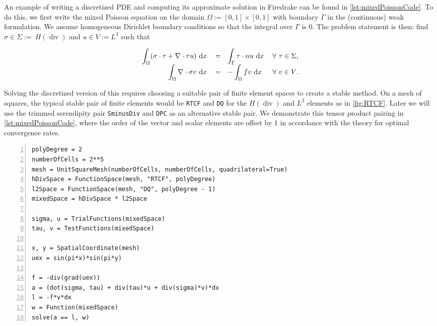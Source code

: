 \documentclass[format=acmsmall,screen,timestamp=false,a4paper]{acmart}
\DeclareMathOperator{\Div}{div}
\newcommand{\hdiv}{\ensuremath{{H}(\Div)}\xspace}
\begin{document}
An example of writing a discretized PDE and computing its approximate solution in Firedrake can be found in \cref{lst:mixedPoissonCode}. To do this, we first write the mixed Poisson equation on the domain $\Omega := [0, 1] \times [0,1]$ with boundary $\Gamma$ in the (continuous) weak formulation.  We assume homogeneous Dirichlet boundary conditions so that the integral over $\Gamma$ is $0$.  The problem statement is then:
find $\sigma \in \Sigma :=~$\hdiv and $u \in V := L^2$ such that

\begin{equation}\label{eq:MixedPoisson}
\begin{tabular}{rllll}

$\displaystyle\int_\Omega (\sigma \cdot \tau + \nabla\cdot\tau u) \text{ d}x$ & $=~~\displaystyle \int_\Gamma \tau \cdot n u \text{ d}x$ & $\forall~ \tau\in\Sigma$, \\
$\displaystyle\int_\Omega \nabla \cdot \sigma v \text{ d}x$ & $= ~~\displaystyle -\int_\Omega fv \text{ d}x$ & $\forall~ v\in V$.
\end{tabular}
\end{equation}

Solving the discretized version of this requires choosing a suitable pair of finite element spaces to create a stable method.  On a mesh of squares, the typical stable pair of finite elements would be \texttt{RTCF} and \texttt{DQ} for the \hdiv and $L^2$ elements as in \cref{fig:RTCF}.  Later we will use the trimmed serendipity pair \texttt{SminusDiv} and \texttt{DPC} as an alternative stable pair.  We demonstrate this tensor product pairing in \cref{lst:mixedPoissonCode}, where the order of the vector and scalar elements are offset by 1 in accordance with the theory for optimal convergence rates.


\begin{lstlisting}[float=htpb,caption={Basic Firedrake implementation of the mixed Poisson problem showcasing where to choose the elements that are used and how to create the equations in Firedrake's notation.}, label={lst:mixedPoissonCode}, numbers=left, firstnumber=1, xleftmargin=20pt,  xrightmargin=20pt]
polyDegree = 2
numberOfCells = 2**5
mesh = UnitSquareMesh(numberOfCells, numberOfCells, quadrilateral=True)
hDivSpace = FunctionSpace(mesh, "RTCF", polyDegree)
l2Space = FunctionSpace(mesh, "DQ", polyDegree - 1)
mixedSpace = hDivSpace * l2Space

sigma, u = TrialFunctions(mixedSpace)
tau, v = TestFunctions(mixedSpace)

x, y = SpatialCoordinate(mesh)
uex = sin(pi*x)*sin(pi*y)

f = -div(grad(uex))
a = (dot(sigma, tau) + div(tau)*u + div(sigma)*v)*dx
l = -f*v*dx
w = Function(mixedSpace)
solve(a == l, w)
\end{lstlisting}
\end{document}
